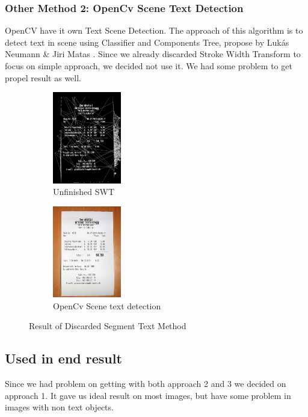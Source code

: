 \documentclass[Report.tex]{subfiles}
\begin{document}
\begin{flushleft}
  \subsubsection{Other Method 2: OpenCv Scene Text Detection}
  OpenCV have it own Text Scene Detection. The approach of this algorithm is to detect text in scene using Classifier and Components Tree, propose by Lukás Neumann \& Jiri Matas \cite{neumann_real-time_2012}. Since we already discarded Stroke Width Transform to focus on simple approach, we decided not use it. We had some problem to get propel result as well.
\end{flushleft}

\begin{figure}[ht]
  \centering
  \begin{subfigure}[t]{4cm}
    \includegraphics[width=3cm]{res/swt.png}
    \caption{Unfinished SWT}
  \end{subfigure}
  \hspace{5mm}%
  \begin{subfigure}[t]{4cm}
    \includegraphics[width=3cm]{res/OpenCV_Std.png}
    \caption{OpenCv Scene text detection}
  \end{subfigure}
  \hspace{5mm}%
  \caption{Result of Discarded Segment Text Method}
  \label{fig:Text_detection_result}
\end{figure}


\subsection{Used in end result}
Since we had problem on getting with both approach 2 and 3 we decided on approach 1. It gave us ideal result on most images, but have some problem in images with non text objects.
\end{document}
